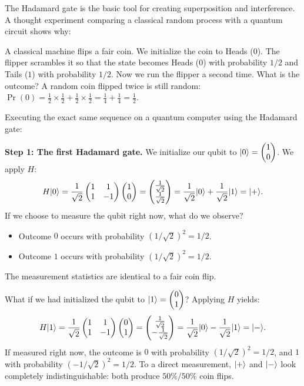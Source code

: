 The Hadamard gate is the basic tool for creating superposition and interference. A thought experiment comparing a classical random process
with a quantum circuit shows why:

A classical machine flips a fair coin. We initialize the coin to Heads
($0$). The flipper scrambles it so that the state becomes Heads ($0$) with probability
$1/2$ and Tails ($1$) with probability $1/2$. Now we run the flipper a second time.
What is the outcome? A random coin flipped twice is still random:
$\Pr(0) = \frac{1}{2}\times\frac{1}{2} + \frac{1}{2}\times\frac{1}{2} = \frac{1}{4} + \frac{1}{4} = \frac{1}{2}$.

Executing the exact same sequence on a quantum computer using the Hadamard
gate:

\textbf{Step 1: The first Hadamard gate.}
We initialize our qubit to $\lvert 0 \rangle = \begin{pmatrix}1\\0\end{pmatrix}$. We apply $H$:
\[
  H\lvert 0 \rangle = \frac{1}{\sqrt{2}}\begin{pmatrix} 1 & 1 \\ 1 & -1 \end{pmatrix}\begin{pmatrix}1 \\ 0\end{pmatrix}
  = \begin{pmatrix}\frac{1}{\sqrt{2}} \\ \frac{1}{\sqrt{2}}\end{pmatrix}
  = \frac{1}{\sqrt{2}}\lvert 0 \rangle + \frac{1}{\sqrt{2}}\lvert 1 \rangle = \lvert + \rangle.
\]
If we choose to measure the qubit right now, what do we observe?
\begin{itemize}
  \item Outcome $0$ occurs with probability $(1/\sqrt{2})^2 = 1/2$.
  \item Outcome $1$ occurs with probability $(1/\sqrt{2})^2 = 1/2$.
\end{itemize}
The measurement statistics are identical to a fair coin flip.

What if we had initialized the qubit to $\lvert 1 \rangle = \begin{pmatrix}0\\1\end{pmatrix}$? Applying $H$ yields:
\[
  H\lvert 1 \rangle = \frac{1}{\sqrt{2}}\begin{pmatrix} 1 & 1 \\ 1 & -1 \end{pmatrix}\begin{pmatrix}0 \\ 1\end{pmatrix}
  = \begin{pmatrix}\frac{1}{\sqrt{2}} \\ -\frac{1}{\sqrt{2}}\end{pmatrix}
  = \frac{1}{\sqrt{2}}\lvert 0 \rangle - \frac{1}{\sqrt{2}}\lvert 1 \rangle = \lvert - \rangle.
\]
If measured right now, the outcome is $0$ with probability $(1/\sqrt{2})^2 = 1/2$,
and $1$ with probability $(-1/\sqrt{2})^2 = 1/2$. To a direct measurement,
$\lvert + \rangle$ and $\lvert - \rangle$ look completely indistinguishable: both produce $50\%/50\%$
coin flips.

